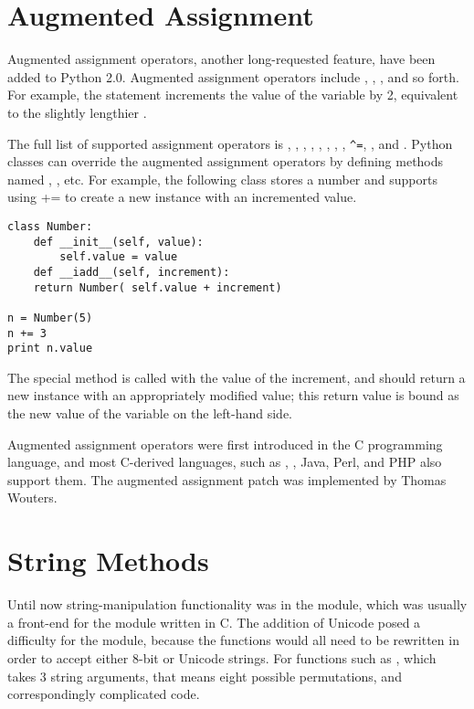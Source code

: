 \documentclass{howto}
\begin{document}
\section{Augmented Assignment}

Augmented assignment operators, another long-requested feature, have
been added to Python 2.0.  Augmented assignment operators include
\code{+=}, \code{-=}, \code{*=}, and so forth.  For example, the
statement  increments the value of the variable 
 by 2, equivalent to the slightly lengthier .

The full list of supported assignment operators is \code{+=},
\code{-=}, \code{*=}, \code{/=}, \code{\%=}, \code{**=}, \code{\&=},
\code{|=}, \verb|^=|, \code{>>=}, and \code{<<=}.  Python classes can
override the augmented assignment operators by defining methods named
, , etc.  For example, the following
 class stores a number and supports using += to create a
new instance with an incremented value.

\begin{verbatim}
class Number:
    def __init__(self, value):
        self.value = value
    def __iadd__(self, increment):
	return Number( self.value + increment)

n = Number(5)
n += 3
print n.value
\end{verbatim}

The  special method is called with the value of the
increment, and should return a new instance with an appropriately
modified value; this return value is bound as the new value of the
variable on the left-hand side. 

Augmented assignment operators were first introduced in the C
programming language, and most C-derived languages, such as
, \Cpp, Java, Perl, and PHP also support them.  The augmented
assignment patch was implemented by Thomas Wouters.

\section{String Methods}

Until now string-manipulation functionality was in the 
module, which was usually a front-end for the 
module written in C.  The addition of Unicode posed a difficulty for
the  module, because the functions would all need to be
rewritten in order to accept either 8-bit or Unicode strings.  For
functions such as , which takes 3 string
arguments, that means eight possible permutations, and correspondingly
complicated code.
\end{document}
